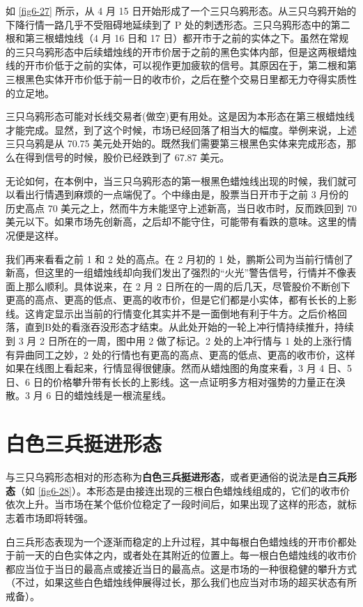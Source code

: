 如 \autoref{fig6-27} 所示，从 4 月 15 日开始形成了一个三只乌鸦形态。从三只乌鸦开始的下降行情一路几乎不受阻碍地延续到了 P 处的刺透形态。三只乌鸦形态中的第二根和第三根蜡烛线（4 月 16 日和 17 日）都开市于之前的实体之下。虽然在常规的三只乌鸦形态中后续蜡烛线的开市价居于之前的黑色实体内部，但是这两根蜡烛线的开市价低于之前的实体，可以视作更加疲软的信号。其原因在于，第二根和第三根黑色实体开市价低于前一日的收市价，之后在整个交易日里都无力夺得实质性的立足地。

三只乌鸦形态可能对长线交易者(做空)更有用处。这是因为本形态在第三根蜡烛线才能完成。显然，到了这个时候，市场已经回落了相当大的幅度。举例来说，上述三只乌鸦是从 70.75 美元处开始的。既然我们需要第三根黑色实体来完成形态，那么在得到信号的时候，股价已经跌到了 67.87 美元。

无论如何，在本例中，当三只乌鸦形态的第一根黑色蜡烛线出现的时候，我们就可以看出行情遇到麻烦的一点端倪了。个中缘由是，股票当日开市于之前 3 月份的历史高点 70 美元之上，然而牛方未能坚守上述新高，当日收市时，反而跌回到 70 美元以下。如果市场先创新高，之后却不能守住，可能带有看跌的意味。这里的情况便是这样。


我们再来看看之前 1 和 2 处的高点。在 2 月初的 1 处，鹏斯公司为当前行情创了新高，但这里的一组蜡烛线却向我们发出了强烈的“火光”警告信号，行情并不像表面上那么顺利。具体说来，在 2 月 2 日所在的一周的后几天，尽管股价不断创下更高的高点、更高的低点、更高的收市价，但是它们都是小实体，都有长长的上影线。这肯定显示出当前的行情变化其实并不是一面倒地有利于牛方。之后价格回落，直到B处的看涨吞没形态才结束。从此处开始的一轮上冲行情持续推升，持续到 3 月 2 日所在的一周，图中用 2 做了标记。2 处的上冲行情与 1 处的上涨行情有异曲同工之妙，2 处的行情也有更高的高点、更高的低点、更高的收市价，这样如果在线图上看起来，行情显得很健康。然而从蜡烛图的角度来看，3 月 4 日、5 日、6 日的价格攀升带有长长的上影线。这一点证明多方相对强势的力量正在涣散。3 月 6 日的蜡烛线是一根流星线。

\section{白色三兵挺进形态}
与三只乌鸦形态相对的形态称为\textbf{白色三兵挺进形态}，或者更通俗的说法是\textbf{白三兵形态}（如 \autoref{fig6-28}）。本形态是由接连出现的三根白色蜡烛线组成的，它们的收市价依次上升。当市场在某个低价位稳定了一段时间后，如果出现了这样的形态，就标志着市场即将转强。

白三兵形态表现为一个逐渐而稳定的上升过程，其中每根白色蜡烛线的开市价都处于前一天的白色实体之内，或者处在其附近的位置上。每一根白色蜡烛线的收市价都应当位于当日的最高点或接近当日的最高点。这是市场的一种很稳健的攀升方式（不过，如果这些白色蜡烛线伸展得过长，那么我们也应当对市场的超买状态有所戒备）。


